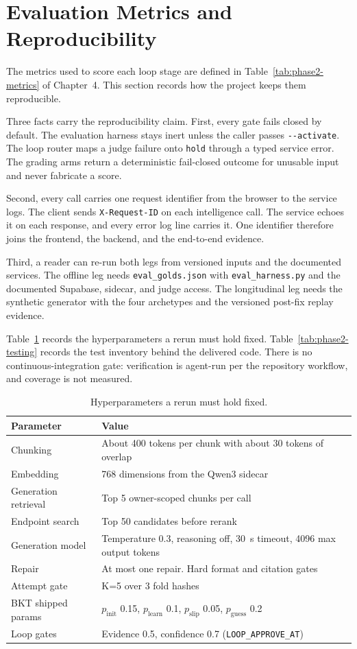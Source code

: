 \section{Evaluation Metrics and Reproducibility}
The metrics used to score each loop stage are defined in Table~\ref{tab:phase2-metrics} of Chapter~4. This section records how the project keeps them reproducible.

Three facts carry the reproducibility claim. First, every gate fails closed by default. The evaluation harness stays inert unless the caller passes \texttt{-{}-activate}. The loop router maps a judge failure onto \texttt{hold} through a typed service error. The grading arms return a deterministic fail-closed outcome for unusable input and never fabricate a score.

Second, every call carries one request identifier from the browser to the service logs. The client sends \texttt{X-Request-ID} on each intelligence call. The service echoes it on each response, and every error log line carries it. One identifier therefore joins the frontend, the backend, and the end-to-end evidence.

Third, a reader can re-run both legs from versioned inputs and the documented services. The offline leg needs \texttt{eval\_golds.json} with \texttt{eval\_harness.py} and the documented Supabase, sidecar, and judge access. The longitudinal leg needs the synthetic generator with the four archetypes and the versioned post-fix replay evidence.

Table~\ref{tab:phase2-hyperparams} records the hyperparameters a rerun must hold fixed. Table~\ref{tab:phase2-testing} records the test inventory behind the delivered code. There is no continuous-integration gate: verification is agent-run per the repository workflow, and coverage is not measured.

\begin{table}[htbp]
\centering
\footnotesize
\caption{Hyperparameters a rerun must hold fixed.}
\label{tab:phase2-hyperparams}
\begin{tabular}{p{4.8cm} p{7.6cm}}
\toprule
\textbf{Parameter} & \textbf{Value} \\
\midrule
Chunking & About 400 tokens per chunk with about 30 tokens of overlap \\
Embedding & 768 dimensions from the Qwen3 sidecar \\
Generation retrieval & Top 5 owner-scoped chunks per call \\
Endpoint search & Top 50 candidates before rerank \\
Generation model & Temperature 0.3, reasoning off, 30~s timeout, 4096 max output tokens \\
Repair & At most one repair. Hard format and citation gates \\
Attempt gate & K=5 over 3 fold hashes \\
BKT shipped params & $p_{\text{init}}$ 0.15, $p_{\text{learn}}$ 0.1, $p_{\text{slip}}$ 0.05, $p_{\text{guess}}$ 0.2 \\
Loop gates & Evidence 0.5, confidence 0.7 (\texttt{LOOP\_APPROVE\_AT}) \\
\bottomrule
\end{tabular}
\end{table}


